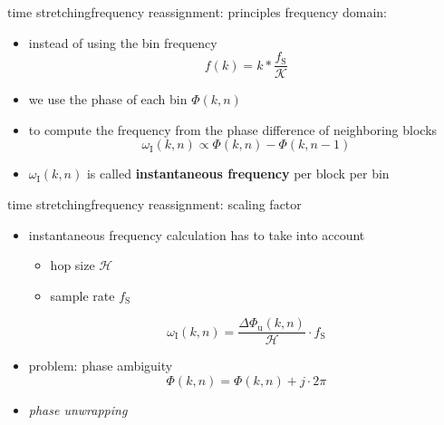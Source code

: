         \begin{frame}{time stretching}{frequency reassignment: principles}
            frequency domain:
            \begin{itemize}
                \item   instead of using the bin frequency
                    \[ f(k) = k*\frac{f_\mathrm{S}}{\mathcal{K}}\]
                \item   we use the phase of each bin $\Phi(k,n)$
                \item   to compute the frequency from the phase difference of neighboring blocks
                    \begin{equation*}\label{eq:phasediff}
                        \omega_{\mathrm{I}}(k,n)	\propto \Phi(k,n)-\Phi(k,n-1)
                    \end{equation*}
                \item<2->   $\omega_{\mathrm{I}}(k,n)$ is called \textbf{instantaneous frequency} per block per bin
            \end{itemize}
        \end{frame}
        \begin{frame}{time stretching}{frequency reassignment: scaling factor}
            \begin{itemize}
                \item instantaneous frequency calculation has to take into account
                    \begin{itemize}
                        \item   hop size $\mathcal{H}$
                        \item   sample rate $f_\mathrm{S}$
                    \end{itemize}
                
                    \begin{equation*}
                        \omega_{\mathrm{I}}(k,n) = \frac{\Delta\Phi_{\mathrm{u}}(k,n)}{\mathcal{H}}\cdot f_{\mathrm{S}} 
                    \end{equation*}
                \item<2-> problem: phase ambiguity
                    \begin{equation*}
                        \Phi(k,n) = \Phi(k,n) + j\cdot 2\pi
                    \end{equation*}
                \item<3->[$\Rightarrow$] \textit{phase unwrapping}
            \end{itemize}
        \end{frame}
